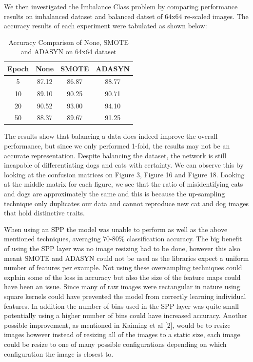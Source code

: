 \documentclass{article}
\begin{document}
We then investigated the Imbalance Class problem by comparing performance results on imbalanced dataset and balanced datset of 64x64 re-scaled images. The accuracy results of each experiment were tabulated as shown below:
\begin{table}[ht]
	\caption{Accuracy Comparison of None, SMOTE and ADASYN on 64x64 dataset} %
	\centering %
	\begin{tabular}{c c c c} %
		\hline\hline %
		
		Epoch &  None & SMOTE & ADASYN\\
		\hline

		\hline %
		5  &  87.12 & 86.87 & 88.77\\
		10 &  89.10 & 90.25 & 90.71\\
		20 &  90.52 & 93.00 & 94.10\\
		50 &  88.37 & 89.67 & 91.25\\ [1ex] %
		\hline %
	\end{tabular}
	\label{table:balanced} %
\end{table} 

The results show that balancing a data does indeed improve the overall performance, but since we only performed 1-fold, the results may not be an accurate representation. Despite balancing the dataset, the network is still incapable of differentiating dogs and cats with certainty. We can observe this by looking at the confusion matrices on Figure 3, Figure 16 and Figure 18. Looking at the middle matrix for each figure, we see that the ratio of misidentifying cats and dogs are approximately the same and this is because the up-sampling technique only duplicates our data and cannot reproduce new cat and dog images that hold distinctive traits. 

When using an SPP the model was unable to perform as well as the above mentioned techniques, averaging 70-80\% classification accuracy. The big benefit of using the SPP layer was no image resizing had to be done, however this also meant SMOTE and ADASYN could not be used as the libraries expect a uniform number of features per example. Not using these oversampling techniques could explain some of the loss in accuracy but also the size of the feature maps could have been an issue. Since many of raw images were rectangular in nature using square kernels could have prevented the model from correctly learning individual features. In addition the number of bins used in the SPP layer was quite small potentially using a higher number of bins could have increased accuracy. Another possible improvement, as mentioned in Kaiming et al [2], would be to resize images however instead of resizing all of the images to a static size, each image could be resize to one of many possible configurations depending on which configuration the image is closest to. 
\end{document}
